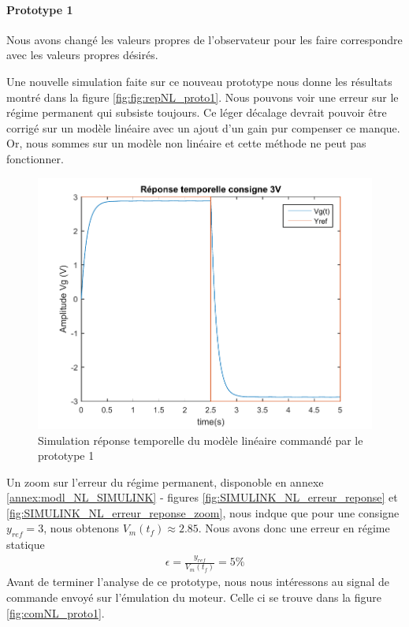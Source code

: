 \paragraph{Prototype 1}
Nous avons changé les valeurs propres de l'observateur pour les faire correspondre avec les valeurs propres désirés. 		
			
		Une nouvelle simulation faite sur ce nouveau prototype nous donne les résultats montré dans la figure \ref{fig:fig:repNL_proto1}. Nous pouvons voir une erreur sur le régime permanent qui subsiste toujours. Ce léger décalage devrait pouvoir être corrigé sur un modèle linéaire avec un ajout d'un gain pur compenser ce manque. Or, nous sommes sur un modèle non linéaire et cette méthode ne peut pas fonctionner.
\begin{figure}[!ht]
\centering
\includegraphics[width= .8\textwidth]{./IV/images/repNL_proto1.pdf}
\caption{Simulation réponse temporelle du modèle linéaire commandé par le prototype 1\label{fig:repNL_proto1} }
\end{figure}
		Un zoom sur l'erreur du régime permanent, disponoble en annexe \ref{annex:modl_NL_SIMULINK} - figures \ref{fig:SIMULINK_NL_erreur_reponse} et \ref{fig:SIMULINK_NL_erreur_reponse_zoom}, nous indque que pour une consigne $y_{ref} = 3$, nous obtenons $V_m(t_f)\approx 2.85$. Nous avons donc une erreur en régime statique \begin{align*}
\epsilon = \frac{y_{ref}}{V_m(t_f)} = 5\%
\end{align*}
Avant de terminer l'analyse de ce prototype, nous nous intéressons au signal de commande envoyé sur l'émulation du moteur. Celle ci se trouve dans la figure \ref{fig:comNL_proto1}. 
